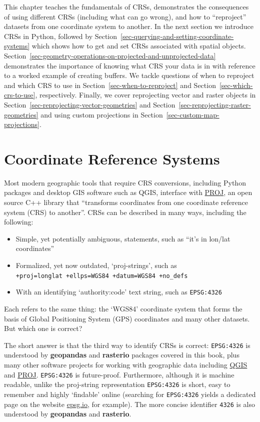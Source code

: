 \documentclass[
  letterpaper,
]{krantz}
\providecommand{\tightlist}{%
  \setlength{\itemsep}{0pt}\setlength{\parskip}{0pt}}\usepackage{longtable,booktabs,array}
\begin{document}
This chapter teaches the fundamentals of CRSs, demonstrates the
consequences of using different CRSs (including what can go wrong), and
how to ``reproject'' datasets from one coordinate system to another. In
the next section we introduce CRSs in Python, followed by
Section~\ref{sec-querying-and-setting-coordinate-systems} which shows
how to get and set CRSs associated with spatial objects.
Section~\ref{sec-geometry-operations-on-projected-and-unprojected-data}
demonstrates the importance of knowing what CRS your data is in with
reference to a worked example of creating buffers. We tackle questions
of when to reproject and which CRS to use in
Section~\ref{sec-when-to-reproject} and
Section~\ref{sec-which-crs-to-use}, respectively. Finally, we cover
reprojecting vector and raster objects in
Section~\ref{sec-reprojecting-vector-geometries} and
Section~\ref{sec-reprojecting-raster-geometries} and using custom
projections in Section~\ref{sec-custom-map-projections}.

\section{Coordinate Reference
Systems}\label{sec-coordinate-reference-systems}

Most modern geographic tools that require CRS conversions, including
Python packages and desktop GIS software such as QGIS, interface with
\href{https://proj.org/}{PROJ}, an open source C++ library that
``transforms coordinates from one coordinate reference system (CRS) to
another''. CRSs can be described in many ways, including the following:

\begin{itemize}
\tightlist
\item
  Simple, yet potentially ambiguous, statements, such as ``it's in
  lon/lat coordinates''
\item
  Formalized, yet now outdated, `proj-strings', such as
  \texttt{+proj=longlat\ +ellps=WGS84\ +datum=WGS84\ +no\_defs}
\item
  With an identifying `authority:code' text string, such as
  \texttt{EPSG:4326}
\end{itemize}

Each refers to the same thing: the `WGS84' coordinate system that forms
the basis of Global Positioning System (GPS) coordinates and many other
datasets. But which one is correct?

The short answer is that the third way to identify CRSs is correct:
\texttt{EPSG:4326} is understood by \textbf{geopandas} and
\textbf{rasterio} packages covered in this book, plus many other
software projects for working with geographic data including
\href{https://docs.qgis.org/3.22/en/docs/user_manual/working_with_projections/working_with_projections.html}{QGIS}
and \href{https://proj.org/development/quickstart.html}{PROJ}.
\texttt{EPSG:4326} is future-proof. Furthermore, although it is machine
readable, unlike the proj-string representation \texttt{EPSG:4326} is
short, easy to remember and highly `findable' online (searching for
\texttt{EPSG:4326} yields a dedicated page on the website
\href{https://epsg.io/4326}{epsg.io}, for example). The more concise
identifier \texttt{4326} is also understood by \textbf{geopandas} and
\textbf{rasterio}.
\end{document}
